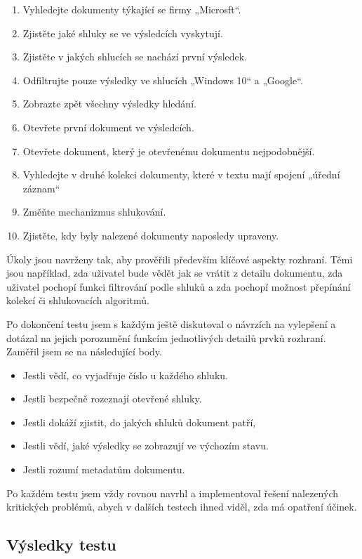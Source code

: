 \begin{enumerate}
\item Vyhledejte dokumenty týkající se firmy „Microsft“.
\item Zjistěte jaké shluky se ve výsledcích vyskytují.
\item Zjistěte v jakých shlucích se nachází první výsledek.
\item \label{task_clusterfilter}Odfiltrujte pouze výsledky ve shlucích „Windows 10“ a „Google“.
\item Zobrazte zpět všechny výsledky hledání.
\item Otevřete první dokument ve výsledcích.
\item Otevřete dokument, který je otevřenému dokumentu nejpodobnější.
\item Vyhledejte v druhé kolekci dokumenty, které v textu mají spojení „úřední záznam“
\item \label{task_engine}Změňte mechanizmus shlukování.
\item Zjistěte, kdy byly nalezené dokumenty naposledy upraveny.
\end{enumerate}

Úkoly jsou navrženy tak, aby prověřili především klíčové aspekty rozhraní. Těmi jsou například, zda uživatel bude vědět jak se vrátit z detailu dokumentu, zda uživatel pochopí funkci filtrování podle shluků a zda pochopí možnost přepínání kolekcí či shlukovacích algoritmů.

Po dokončení testu jsem s každým ještě diskutoval o návrzích na vylepšení a dotázal na jejich porozumění funkcím jednotlivých detailů prvků rozhraní. Zaměřil jsem se na následující body.

\begin{itemize}
\item Jestli vědí, co vyjadřuje číslo u každého shluku.
\item Jestli bezpečně rozeznají otevřené shluky.
\item Jestli dokáží zjistit, do jakých shluků dokument patří,
\item Jestli vědí, jaké výsledky se zobrazují ve výchozím stavu.
\item Jestli rozumí metadatům dokumentu.
\end{itemize}

Po každém testu jsem vždy rovnou navrhl a implementoval řešení nalezených kritických problémů, abych v dalších testech ihned viděl, zda má opatření účinek.

\subsection{Výsledky testu}
